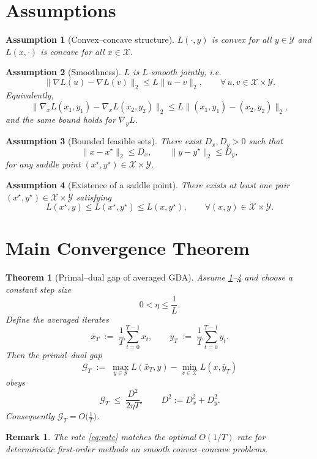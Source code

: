 \documentclass{article}
\newtheorem{theorem}{Theorem}
\newtheorem{assumption}{Assumption}
\newtheorem{remark}{Remark}
\begin{document}
\section*{Assumptions}\label{sec:assumptions}
\begin{assumption}[Convex–concave structure]\label{as:convexconcave}
$L(\cdot ,y)$ is convex for all $y\in\mathcal{Y}$ and $L(x,\cdot )$ is concave for all $x\in\mathcal{X}$.
\end{assumption}
\begin{assumption}[Smoothness]\label{as:smooth}
$L$ is $L$‑smooth jointly, i.e.
\[
\|\nabla L(u)-\nabla L(v)\|_{2}\leq L\|u-v\|_{2},\qquad 
\forall\,u,v\in\mathcal{X}\times\mathcal{Y}.
\]
Equivalently,
\[
\|\nabla_{x}L(x_{1},y_{1})-\nabla_{x}L(x_{2},y_{2})\|_{2}\le L\|(x_{1},y_{1})-(x_{2},y_{2})\|_{2},
\]
and the same bound holds for $\nabla_{y}L$.
\end{assumption}
\begin{assumption}[Bounded feasible sets]\label{as:bounded}
There exist $D_{x},D_{y}>0$ such that
\[
\|x-x^{\star}\|_{2}\le D_{x},\qquad \|y-y^{\star}\|_{2}\le D_{y},
\]
for any saddle point $(x^{\star},y^{\star})\in\mathcal{X}\times\mathcal{Y}$.
\end{assumption}
\begin{assumption}[Existence of a saddle point]\label{as:saddle}
There exists at least one pair $(x^{\star},y^{\star})\in\mathcal{X}\times\mathcal{Y}$ satisfying
\[
L(x^{\star},y)\le L(x^{\star},y^{\star})\le L(x,y^{\star}),\qquad\forall (x,y)\in\mathcal{X}\times\mathcal{Y}.
\]
\end{assumption}

\section*{Main Convergence Theorem}\label{sec:theory}
\begin{theorem}[Primal–dual gap of averaged GDA]\label{thm:convergence}
Assume \ref{as:convexconcave}–\ref{as:saddle} and choose a constant step size
\[
0<\eta\le \frac{1}{L}.
\]
Define the averaged iterates
\[
\bar{x}_{T}\;:=\;\frac{1}{T}\sum_{t=0}^{T-1}x_{t},\qquad 
\bar{y}_{T}\;:=\;\frac{1}{T}\sum_{t=0}^{T-1}y_{t}.
\]
Then the \emph{primal–dual gap}
\[
\mathcal{G}_{T}\;:=\;\max_{y\in\mathcal{Y}}L(\bar{x}_{T},y)-\min_{x\in\mathcal{X}}L(x,\bar{y}_{T})
\]
obeys
\begin{equation}
\mathcal{G}_{T}\;\le\;\frac{D^{2}}{2\eta T},\qquad 
D^{2}:=D_{x}^{2}+D_{y}^{2}. \label{eq:rate}
\end{equation}
Consequently $\mathcal{G}_{T}=O\!\bigl(\tfrac{1}{T}\bigr)$.
\end{theorem}
\begin{remark}
The rate \eqref{eq:rate} matches the optimal $O(1/T)$ rate for deterministic first‑order methods on smooth convex–concave problems.
\end{remark}
\end{document}
